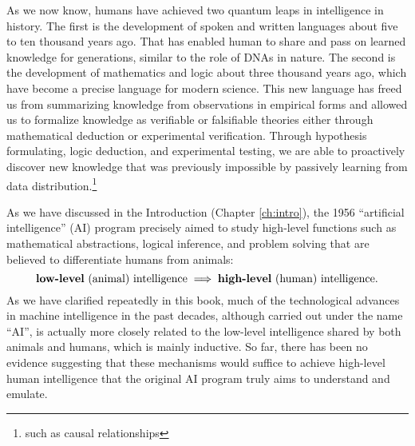 \documentclass[../../book-main.tex]{subfiles}
\begin{document}




As we now know, humans have achieved two quantum leaps in intelligence in history.
The first is the development of spoken and written languages about five to ten thousand years ago. That has enabled human to share and pass on learned knowledge for generations, similar to the role of DNAs in nature. The second is the development of mathematics and logic about three thousand years ago, which have become a precise language for modern science. This new language has freed us from summarizing knowledge from observations in empirical forms and allowed us to formalize knowledge as verifiable or falsifiable theories either through mathematical deduction or experimental verification. Through hypothesis formulating, logic deduction, and experimental testing, we are able to proactively discover new knowledge that was previously impossible by passively learning from data distribution.\footnote{such as causal relationships}

As we have discussed in the Introduction (Chapter \ref{ch:intro}), the 1956 ``artificial intelligence'' (AI) program precisely aimed to study high-level functions such as mathematical abstractions, logical inference, and problem solving that are believed to differentiate humans from animals: 
\begin{equation}
   \mbox{\textbf{low-level} (animal) intelligence} \; \Longrightarrow \; 
   \mbox{\textbf{high-level} (human) intelligence.}
\end{equation}
As we have clarified repeatedly in this book, much of the technological advances in machine intelligence in the past decades, although carried out under the name ``AI'', is actually more closely related to the low-level intelligence shared by both animals and humans, which is mainly inductive. So far, there has been no evidence suggesting that these mechanisms would suffice to achieve high-level human intelligence that the original AI program truly aims to understand and emulate. 
\end{document}
